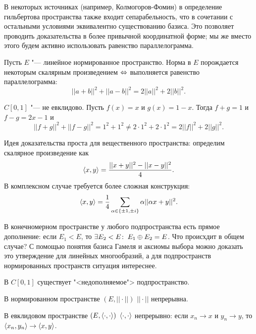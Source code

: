 \documentclass[main]{subfiles}
\begin{document}
\begin{remark}
  В некоторых источниках (например, Колмогоров-Фомин)
  в определение гильбертова пространства также входит
  сепарабельность, что в сочетании с остальными
  условиями эквивалентно существованию базиса.
  Это позволяет проводить доказательства в более
  привычной координатной форме;
  мы же вместо этого будем активно использовать
  равенство параллелограмма.
\end{remark}

\begin{theorem}[б/д]
  Пусть \( E \) "--- линейное нормированное пространство.
  Норма в \( E \) порождается некоторым
  скалярным произведением \( \Leftrightarrow \) выполняется
  равенство
  параллелограмма:
  \[ ||a + b||^2 + ||a - b||^2 = 2||a||^2 + 2||b||^2. \]
\end{theorem}

\begin{example}
  \( C[0, 1] \) "--- не евклидово.
  Пусть \( f(x) = x \) и \( g(x) = 1 - x \).
  Тогда \( f + g = 1 \) и \( f - g = 2x - 1 \) и
  \[ ||f + g||^2 + ||f - g||^2 = 1^2 + 1^2 \ne 2 \cdot 1^2 + 2 \cdot 1^2 =
  2 ||f||^2 + 2||g||^2. \]
\end{example}

Идея доказательства проста для вещественного пространства:
определим скалярное произведение как
\[ \langle x, y \rangle = \frac{||x + y||^2 - ||x - y||^2}{4}. \]
В комплексном случае требуется более сложная конструкция:
\[ \langle x, y \rangle = \frac{1}{4} \sum_{\alpha \in \{ \pm 1, \pm i \}}
\alpha ||\alpha x + y||^2. \]

В конечномерном пространстве
у любого подпространства есть прямое дополнение:
если \( E_1 < E \), то \( \exists E_2 < E \colon \: E_1 \oplus E_2 = E \).
Что происхдит в общем случае?
С помощью понятия базиса Гамеля и аксиомы выбора
можно доказать это утверждение для линейных многообразий,
а для подпространств нормированных пространств ситуация интереснее.

\begin{problem}
  В \( C[0, 1] \) существует "<недополняемое"> подпространство.
\end{problem}

\begin{exercise}
  В нормированном пространстве \( (E, ||\cdot||) \)
  \( || \cdot || \) непрерывна.
\end{exercise}

\begin{exercise}
  В евклидовом пространстве \( (E, \langle \cdot, \cdot \rangle) \)
  \( \langle \cdot, \cdot \rangle \) непрерывно:
  если \( x_n \to x \) и \( y_n \to y \),
  то \( \langle x_n, y_n \rangle \to \langle x, y \rangle \).
\end{exercise}
\end{document}
